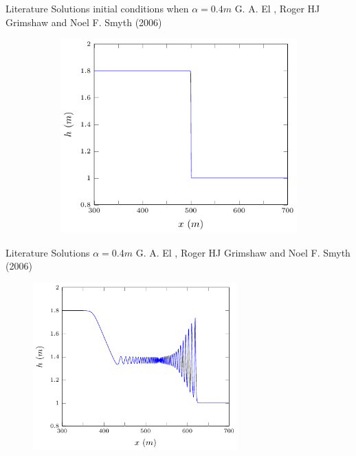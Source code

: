 \documentclass[pdf]{beamer}
\begin{document}
\begin{frame}{Literature Solutions initial conditions when $\alpha = 0.4m$}
	G. A. El , Roger HJ Grimshaw and Noel F. Smyth (2006)
	\begin{figure}
		\centering
		\begin{subfigure}{0.7\textwidth}
			\includegraphics[width=\textwidth]{../Pics/init/DBs9/1-figure0.pdf}
		\end{subfigure}%
	\end{figure}
\end{frame}
\begin{frame}{Literature Solutions $\alpha = 0.4m$}
	G. A. El , Roger HJ Grimshaw and Noel F. Smyth (2006)
	\begin{figure}
		\includegraphics[width=0.7\textwidth]{../Pics/litrec/GrimRec.pdf}
		\label{fig:Litsol2}
	\end{figure}
\end{frame}
\end{document}
